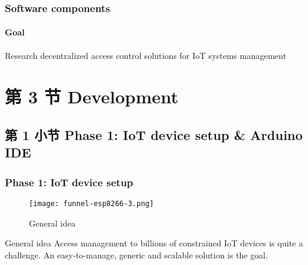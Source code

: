 \documentclass[
    aspectratio=169,                   %
]{beamer}
\begin{document}
    \begin{frame}
        \frametitle{Software components}

        \paragraph{Goal} Research decentralized access control solutions for IoT systems management


    \end{frame}

\section{第 3 节 Development}

\subsection{第 1 小节 Phase 1: IoT device setup \& Arduino IDE}

    \begin{frame}
        \frametitle{Phase 1: IoT device setup}

        \begin{figure}
            \centering
            \begin{stampbox}
                \texttt{[image: funnel-esp8266-3.png]}
            \end{stampbox}
            \caption{General idea}
        \end{figure}
        
        \begin{block}{General idea}
            Access management to billions of constrained IoT devices is quite a challenge. An easy-to-manage, generic and scalable solution is the goal.
        \end{block}

    \end{frame}
\end{document}
